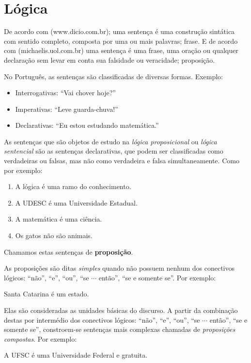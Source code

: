 \chapter{Lógica}

De acordo com (www.dicio.com.br); uma sentença é uma construção sintática com sentido completo, composta por uma ou mais palavras; frase. E de acordo com (michaelis.uol.com.br) uma sentença é uma frase, uma oração ou qualquer declaração sem levar em conta sua falsidade ou veracidade; proposição.

No Português, as sentenças são classificadas de diversas formas. Exemplo:
\begin{itemize}
 \item Interrogativas: ``Vai chover hoje?''
 \item Imperativas: ``Leve guarda-chuva!''
 \item Declarativas: ``Eu estou estudando matemática.''
\end{itemize}

As sentenças que são objetos de estudo na \emph{lógica proposicional} ou \emph{lógica sentencial} são as sentenças declarativas, que podem ser classificadas como verdadeiras ou falsas, mas não como verdadeira e falsa simultaneamente. Como por exemplo:

\begin{enumerate}
 \item A lógica é uma ramo do conhecimento.
 \item A UDESC é uma Universidade Estadual.
 \item A matemática é uma ciência.
 \item Os gatos não são animais.
\end{enumerate}


Chamamos estas sentenças de \textbf{proposição}.

As proposições são ditas \emph{simples} quando não possuem nenhum dos conectivos lógicos: ``não'', ``e'', ``ou'', ``se $\cdots$ então'', ``se e somente se''. Por exemplo:
\begin{center}
Santa Catarina é um estado.
\end{center}
Elas são consideradas as unidades básicas do discurso. A partir da combinação destas por intermédio dos conectivos lógicos: ``não'', ``e'', ``ou'', ``se $\cdots$ então'', ``se e somente se'', constroem-se sentenças mais complexas chamadas de \emph{proposições compostas}. Por exemplo:
\begin{center}
A UFSC é uma Universidade Federal e gratuita.
\end{center}


